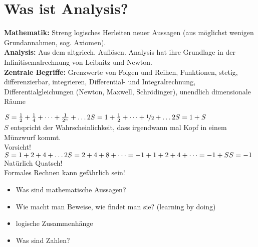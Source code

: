 \documentclass[../ana1.tex]{subfiles}
\begin{document}
\section{Was ist Analysis?}
\textbf{Mathematik:} Streng logisches Herleiten neuer Aussagen (aus möglichst wenigen Grundannahmen, sog. Axiomen).\\
\textbf{Analysis:} Aus dem altgriech. \glqq Auflösen\grqq. Analysis hat ihre Grundlage in der \glqq Infinitisemalrechnung\grqq  \; von Leibnitz und Newton.\\
\textbf{Zentrale Begriffe:} Grenzwerte von Folgen und Reihen, Funktionen, stetig, differenzierbar, integrieren, Differential- und Integralrechnung, Differentialgleichungen (Newton, Maxwell, Schrödinger), unendlich dimensionale Räume
\begin{bsp}
	\(S = \frac{1}{2} + \frac{1}{4} + \dots + \frac{1}{2^n} + \dots\\
	2S = 1 + \frac{1}{2} + \dots + \nicefrac{1}{2} + \dots\\
	2S = 1 + S\)\\
	\(S\) entspricht der Wahrscheinlichkeit, dass irgendwann mal Kopf in einem Münzwurf kommt.\\
	Vorsicht!\\
	\(S = 1 + 2 + 4 + \dots\\
	2S = 2 + 4 + 8 + \dots = -1 + 1 + 2 + 4 + \dots = -1 + S\\
	S = -1\)\\
	Natürlich Quatsch!\\
	Formales Rechnen kann gefährlich sein!

	\begin{itemize}
		\item Was sind mathematische Aussagen?
		\item Wie macht man Beweise, wie findet man sie? (learning by doing)
		\item logische Zusammenhänge
		\item Was sind Zahlen?
	\end{itemize}
\end{bsp}
\end{document}
